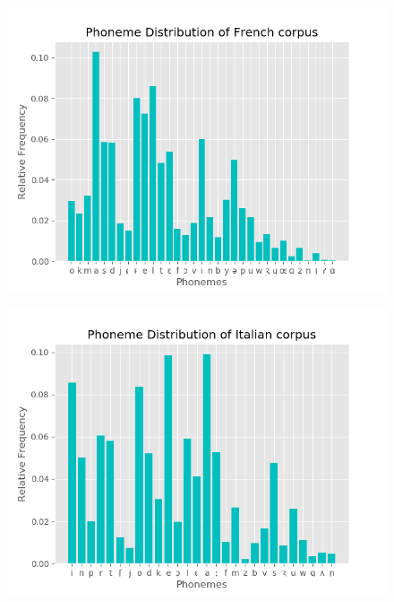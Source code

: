 \documentclass{article}
\begin{document}
\begin{itemize}
\begin{figure}[H]
\begin{minipage}{.5\textwidth}
                    \label{fig:prob1_6_2}
                \end{minipage}
        \end{figure}
        \begin{figure}[H]
            \centering
                \begin{minipage}{.55\textwidth}
                    \centering
                    \includegraphics[keepaspectratio=true,scale=0.35]{French.png} 
                    \label{fig:prob1_6_2}
                \end{minipage}%
                \begin{minipage}{.5\textwidth}
                    \centering
                    \includegraphics[keepaspectratio=true,scale=0.35]{Italian.png}   
                    \label{fig:prob1_6_2}
                \end{minipage}
        \end{figure}
        

\end{itemize}
\end{document}
